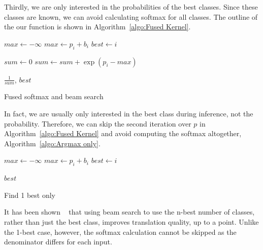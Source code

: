 \documentclass[11pt,a4paper]{article}
\begin{document}
Thirdly, we are only interested in the probabilities of the best classes. Since these classes are known, we can avoid calculating softmax for all classes. The outline of the our function is shown in Algorithm~\ref{algo:Fused Kernel}.

\begin{algorithm}
\begin{algorithmic}


\State $max \gets - \infty$ 
    \State $max \gets p_i + b_i$
    \State $best \gets i$
  \EndIf
\EndFor


\State $sum \gets 0$ 
    \State $sum \gets sum + \exp(p_i - max)$
  \EndIf
\EndFor

\Return $\frac{1}{sum}$, $best$ 

\EndProcedure
\end{algorithmic}

\caption{Fused softmax and beam search}
\label{algo:Fused Kernel}
\end{algorithm}

In fact, we are usually only interested in the best class during inference, not the probability. Therefore, we can skip the second iteration over $p$ in Algorithm~\ref{algo:Fused Kernel} and avoid computing the softmax altogether, Algorithm~\ref{algo:Argmax only}.

\begin{algorithm}
\begin{algorithmic}

\State $max \gets - \infty$ 
    \State $max \gets p_i + b_i$
    \State $best \gets i$
  \EndIf
\EndFor

\Return $best$ 

\EndProcedure

\end{algorithmic}
\caption{Find 1 best only}
\label{algo:Argmax only}
\end{algorithm}

It has been shown ~\citep{koehn-knowles:2017:NMT} that using beam search to use the n-best number of classes, rather than just the best class, improves translation quality, up to a point. Unlike the 1-best case, however, the softmax calculation cannot be skipped as the denominator differs for each input.
\end{document}

